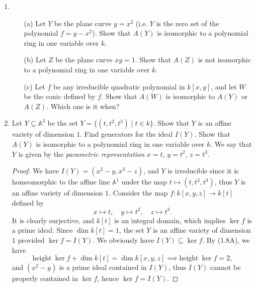 \documentclass[12pt]{article}
\newcommand{\height}[1]{\text{height}~#1}
\newcommand{\A}{\mathbb{A}}
\theoremstyle{definition}
\begin{document}
\begin{enumerate} [label=\textbf{\arabic*.}, leftmargin=-0.05em]

\item 
\begin{itemize}
    \item[(a)] Let $Y$ be the plane curve $y = x^2$ (i.e. $Y$ is the zero set of the polynomial $f = y - x^2$). Show that $A(Y)$ is isomorphic to a polynomial ring in one variable over $k$.

    \item[(b)] Let $Z$ be the plane curve $xy = 1$. Show that $A(Z)$ is not isomorphic to a polynomial ring in one variable over $k$.

    \item[(c)] Let $f$ be any irreducible quadratic polynomial in $k[x, y]$, and let $W$ be the conic defined by $f$. Show that $A(W)$ is isomorphic to $A(Y)$ or $A(Z)$. Which one is it when?
\end{itemize}

\item Let $Y \subseteq \A^3$ be the set $Y = \{(t, t^2, t^3) \mid t \in k \}$. Show that $Y$ is an affine variety of dimension $1$. Find generators for the ideal $I(Y)$. Show that $A(Y)$ is isomorphic to a polynomial ring in one variable over $k$. We say that $Y$ is given by the \textit{parametric representation} $x = t$, $y = t^2$, $z = t^3$.

\begin{proof}
    We have $I(Y) = (x^2 - y, x^3 - z)$, and $Y$ is irreducible since it is homeomorphic to the affine line $\A^1$ under the map $t \mapsto (t, t^2, t^3)$, thus $Y$ is an affine variety of dimension $1$. Consider the map $f : k[x, y, z] \to k[t]$ defined by
    \begin{equation*}
        x \mapsto t, \quad y \mapsto t^2, \quad z \mapsto t^3.
    \end{equation*}
    It is clearly surjective, and $k[t]$ is an integral domain, which implies $\ker{f}$ is a prime ideal. Since $\dim{k[t]} = 1$, the set $Y$ is an affine variety of dimension $1$ provided $\ker{f} = I(Y)$. We obviously have $I(Y) \subseteq \ker{f}$. By (1.8A), we have
    \begin{equation*}
        \height{\ker{f}} + \dim{k[t]} = \dim{k[x, y, z]} \implies \height{\ker{f}} = 2,
    \end{equation*}
    and $(x^2 - y)$ is a prime ideal contained in $I(Y)$, thus $I(Y)$ cannot be properly contained in $\ker{f}$, hence $\ker{f} = I(Y)$.
\end{proof}


\end{enumerate}
\end{document}
